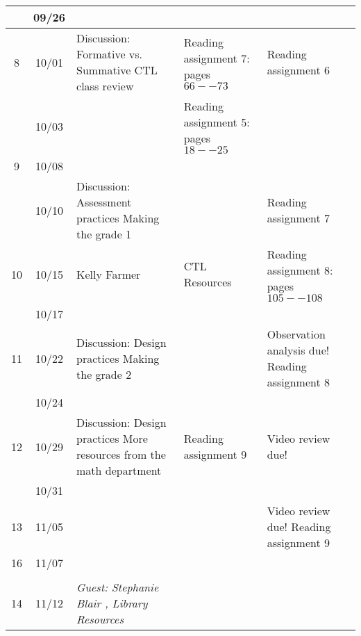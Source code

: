 \begin{longtable}{ |c|c|p{10em}|p{10em}|p{10em}| }
    & 09/26 &  {} & {} & {} \\ \hline

  8 & 10/01 &  {Discussion: Formative vs. Summative CTL class review}  
            & {Reading assignment 7: pages $66--73$} 
            & {Reading assignment 6} \\ \hline

    & 10/03 & {} 
            & {Reading assignment 5: pages $18--25$} & \\ \hline

  9 & 10/08 & 
             &
             & {} \\ \hline

     & 10/10 & {Discussion:  Assessment practices Making the grade 1}   & {}  & {Reading assignment 7} \\ \hline

  10 & 10/15 & {Kelly Farmer} %
             & {CTL Resources}
             & {Reading assignment 8: pages $105--108$} \\ \hline

     & 10/17 & {}   & {}  & {} \\ \hline

  11 & 10/22  & {Discussion:  Design practices Making the grade 2} 
              &  
              & {Observation analysis due! Reading assignment 8} \\ \hline

     & 10/24  & {} &  & {} \\ \hline

  12 & 10/29 &  {Discussion: Design practices More resources from the math department} 
             & {Reading assignment 9}  
             & {Video review due!} \\ \hline

     & 10/31 &  {} & {}  & {} \\ \hline

  13 & 11/05 & {} 
             & 
             & {Video review due! Reading assignment 9} \\ \hline %

  16 & 11/07 & {} & & \\ \hline
             & 
             & {} \\ \hline %

  14 & 11/12 & \textit{Guest: Stephanie Blair , Library Resources}  %
             & 
             & {} \\ \hline %



\end{longtable}
